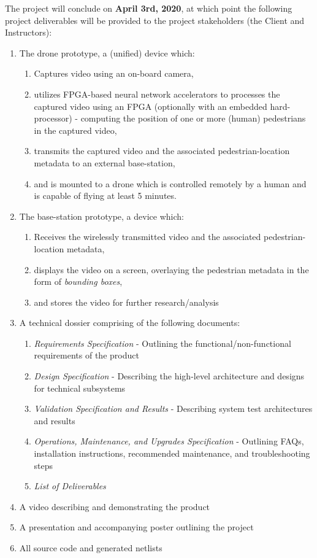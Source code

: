 The project will conclude on \textbf{April 3rd, 2020}, at which point the following project  deliverables will be provided to the project stakeholders (the Client and Instructors):

\begin{enumerate}
\item The drone prototype, a (unified) device which:
\begin{enumerate}
\item Captures video using an on-board camera,
\item utilizes FPGA-based neural network accelerators to processes the captured video using an FPGA (optionally with an embedded hard-processor) - computing the position of one or more (human) pedestrians in the captured video,
\item transmits the captured video and the associated pedestrian-location metadata to an external base-station,
\item and is mounted to a drone which is controlled remotely by a human and is capable of flying at least 5 minutes.
\end{enumerate}
\item The base-station prototype, a device which:
\begin{enumerate}
\item Receives the wirelessly transmitted video and the associated pedestrian-location metadata,
\item displays the video on a screen, overlaying the pedestrian metadata in the form of \textit{bounding boxes},
\item and stores the video for further research/analysis
\end{enumerate}
\item A technical dossier comprising of the following documents:
\begin{enumerate}
\item \textit{Requirements Specification} - Outlining the functional/non-functional requirements of the product
\item \textit{Design Specification} - Describing the high-level architecture and designs for technical subsystems
\item \textit{Validation Specification and Results} - Describing system test architectures and results
\item \textit{Operations, Maintenance, and Upgrades Specification} - Outlining FAQs, installation instructions, recommended maintenance, and troubleshooting steps
\item \textit{List of Deliverables}
\end{enumerate}
\item A video describing and demonstrating the product
\item A presentation and accompanying poster outlining the project
\item All source code and generated netlists
\end{enumerate}